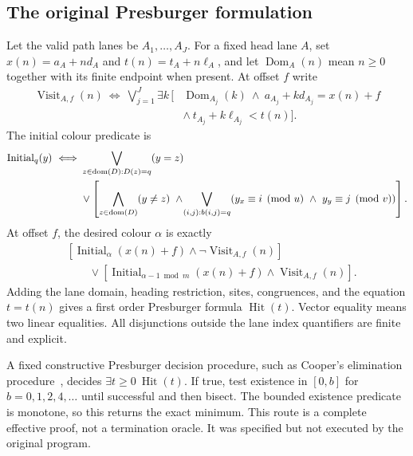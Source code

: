 \documentclass[11pt,letterpaper]{article}
\theoremstyle{definition}\newtheorem{definition}[theorem]{Definition}
\theoremstyle{remark}\newtheorem{remark}[theorem]{Remark}
\begin{document}
\subsection{The original Presburger formulation}\label{ptr:sec:presburger}
Let the valid path lanes be $A_1,\ldots,A_J$. For a fixed head lane $A$, set $x(n)=a_A+n d_A$ and $t(n)=t_A+n\ell_A$, and let $\operatorname{Dom}_A(n)$ mean $n\ge0$ together with its finite endpoint when present. At offset $f$ write
\begin{equation}\label{ptr:eq:visitformula}\begin{aligned}
 \operatorname{Visit}_{A,f}(n)\ \Longleftrightarrow\
 \bigvee_{j=1}^{J}\exists k\,[&\operatorname{Dom}_{A_j}(k)\ \wedge\
 a_{A_j}+k d_{A_j}=x(n)+f\\
 &\wedge\ t_{A_j}+k\ell_{A_j}<t(n)].
\end{aligned}\end{equation}
The initial colour predicate is
\begin{equation}\label{ptr:eq:initialformula}\begin{aligned}
 \operatorname{Initial}_{q}(y)\ \Longleftrightarrow\
 &\bigvee_{z\in\operatorname{dom}(D):D(z)=q}(y=z)\\
 &\vee\left[\bigwedge_{z\in\operatorname{dom}(D)}(y\ne z)
 \ \wedge\!\bigvee_{(i,j):b(i,j)=q}
    (y_x\equiv i\pmod u\ \wedge\ y_y\equiv j\pmod v)\right].
\end{aligned}\end{equation}
At offset $f$, the desired colour $\alpha$ is exactly
\begin{align}\label{ptr:eq:colourpredicate}
 &[\operatorname{Initial}_{\alpha}(x(n)+f)\wedge\neg\operatorname{Visit}_{A,f}(n)]\nonumber\\
 &\qquad\vee[\operatorname{Initial}_{\alpha-1\bmod m}(x(n)+f)
                       \wedge\operatorname{Visit}_{A,f}(n)].
\end{align}
Adding the lane domain, heading restriction, sites, congruences, and the equation $t=t(n)$ gives a first order Presburger formula $\operatorname{Hit}(t)$. Vector equality means two linear equalities. All disjunctions outside the lane index quantifiers are finite and explicit.

A fixed constructive Presburger decision procedure, such as Cooper's elimination procedure~\cite{cooper}, decides $\exists t\ge0\ \operatorname{Hit}(t)$. If true, test existence in $[0,b]$ for $b=0,1,2,4,\ldots$ until successful and then bisect. The bounded existence predicate is monotone, so this returns the exact minimum. This route is a complete effective proof, not a termination oracle. It was specified but not executed by the original program.
\end{document}
